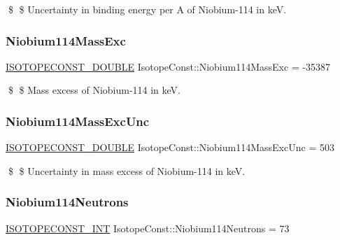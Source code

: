\$ \$ Uncertainty in binding energy per A of Niobium-\/114 in keV. \mbox{\label{group___isotope_const-_niobium-_nb114_ga296d7c35ba7774f5fa0d2517d0e2363b}} 
\subsubsection{\texorpdfstring{Niobium114\+Mass\+Exc}{Niobium114MassExc}}
{\footnotesize\ttfamily \mbox{\hyperlink{group___isotope_const-_macros_ga8f45a7272ce02c0b4c65c44636ed719a}{I\+S\+O\+T\+O\+P\+E\+C\+O\+N\+S\+T\+\_\+\+D\+O\+U\+B\+LE}} Isotope\+Const\+::\+Niobium114\+Mass\+Exc = -\/35387}

\$ \$ Mass excess of Niobium-\/114 in keV. \mbox{\label{group___isotope_const-_niobium-_nb114_ga9a75098a63c2810787301de4ad870c8b}} 
\subsubsection{\texorpdfstring{Niobium114\+Mass\+Exc\+Unc}{Niobium114MassExcUnc}}
{\footnotesize\ttfamily \mbox{\hyperlink{group___isotope_const-_macros_ga8f45a7272ce02c0b4c65c44636ed719a}{I\+S\+O\+T\+O\+P\+E\+C\+O\+N\+S\+T\+\_\+\+D\+O\+U\+B\+LE}} Isotope\+Const\+::\+Niobium114\+Mass\+Exc\+Unc = 503}

\$ \$ Uncertainty in mass excess of Niobium-\/114 in keV. \mbox{\label{group___isotope_const-_niobium-_nb114_gadfa2d5e278947921f8b8daf394f750ac}} 
\subsubsection{\texorpdfstring{Niobium114\+Neutrons}{Niobium114Neutrons}}
{\footnotesize\ttfamily \mbox{\hyperlink{group___isotope_const-_macros_ga5f18360b3e99483a35c32d789e62621c}{I\+S\+O\+T\+O\+P\+E\+C\+O\+N\+S\+T\+\_\+\+I\+NT}} Isotope\+Const\+::\+Niobium114\+Neutrons = 73}

